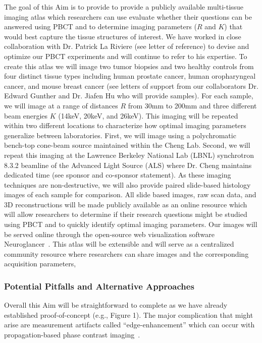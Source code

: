 \documentclass{NIHGrant}
\theoremstyle{theorem}
\begin{document}
The goal of this Aim is to provide to provide a publicly available multi-tissue
imaging atlas which researchers can use evaluate whether their questions
can be answered using PBCT and to determine imaging parameters (\(R\) and \(K\))
that would best capture the tissue structures of interest. We have worked in close collaboration with Dr. Patrick La Riviere (see letter of reference) to devise and optimize our PBCT experiments and will continue to refer to his expertise. To create this atlas
we will image two tumor biopsies and two healthy controls from four distinct
tissue types including human prostate cancer, human oropharyngeal cancer, and mouse
breast cancer (see letters of support from our collaborators Dr. Edward Gunther and Dr. Jiafen Hu who will
provide samples). For each sample, we will image at a range of distances \(R\)
from 30mm to 200mm and three different beam energies \(K\) (14keV, 20keV, and
26keV). This imaging will be repeated within two different locations to
characterize how optimal imaging parameters generalize between laboratories.
First, we will image using a polychromatic bench-top cone-beam source maintained within the
Cheng Lab. Second, we will repeat this imaging at the Lawrence Berkeley National
Lab (LBNL) synchrotron 8.3.2 beamline of the Advanced Light Source (ALS) where Dr.
Cheng maintains dedicated time (see sponsor and co-sponsor statement). As these imaging
techniques are non-destructive, we will also provide paired slide-based
histology images of each sample for comparison. All slide based images, raw scan
data, and 3D reconstructions will be made publicly available as an online
resource which will allow researchers to determine if their research questions
might be studied using PBCT and to quickly identify optimal imaging parameters.
Our images will be served online through the open-source web visualization
software Neuroglancer~\cite{google_neuroglancer_2023}. This atlas will be extensible and will serve as a
centralized community resource where researchers can share images and the corresponding acquisition parameters,

\subsubsection*{Potential Pitfalls and Alternative Approaches}
Overall this Aim will be straightforward to complete as we have already
established proof-of-concept (e.g., Figure 1). The major complication that
might arise are measurement artifacts called ``edge-enhancement'' which can
occur with propagation-based phase contrast imaging~\cite{cheng_whole-animal_2011,ding_computational_2019}.
\end{document}
